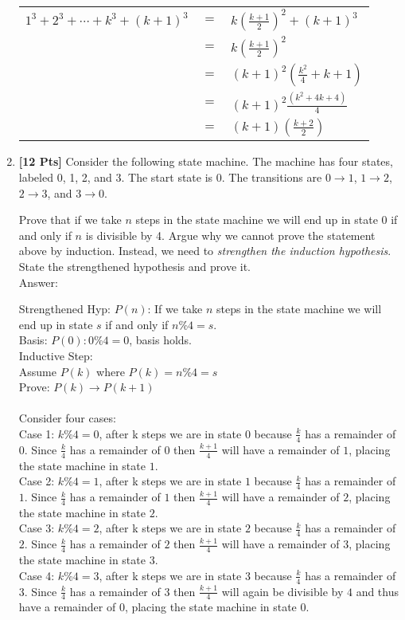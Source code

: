 \begin{enumerate}
\begin{table}[h]
\centering
\begin{tabular}{rcl}
$1^3 + 2^3 + \cdots + k^3 + (k+1)^3$ & $=$ & $k(\frac{k+1}{2})^2 + (k+1)^3$ \\
                                     & $=$ & $k(\frac{k+1}{2})^2$           \\
                                     & $=$ & $(k+1)^2 (\frac{k^2}{4} +k +1)$  \\
                                     & $=$ & $(k+1)^2 \frac{(k^2 +4k +4)}{4}$ \\
                                     & $=$ & $(k+1)(\frac{k+2}{2})$          
\end{tabular}
\end{table}

\item {\bf [12 Pts]} Consider the following state machine. The machine has four states, labeled 0, 1, 2, and 3. The start state is 0.
The transitions are $0 \rightarrow 1$, $1 \rightarrow 2$, $2 \rightarrow 3$,
and $3 \rightarrow 0$.

Prove that if we take $n$ steps in the state machine we will end up in state 0 if and only if $n$ is divisible by 4. Argue why we cannot prove the statement above by induction. Instead, we need to {\it strengthen the induction hypothesis}. State the strengthened hypothesis and prove it.\\

Answer:

Strengthened Hyp:  $P(n)$: If we take $n$ steps in the state machine we will end up in state $s$ if and only if $n\%4 = s$.\\

Basis: $P(0): 0\%4 = 0$, basis holds.\\
Inductive Step:\\
Assume $P(k)$ where $P(k) = n\%4 = s$\\
Prove: $P(k) \rightarrow P(k+1)$\\\\
Consider four cases:\\
Case 1: $k\%4 = 0$, after k steps we are in state $0$ because $\frac{k}{4}$ has a remainder of $0$. Since $\frac{k}{4}$ has a remainder of $0$ then $\frac{k+1}{4}$ will have a remainder of $1$, placing the state machine in state $1$.\\
Case 2: $k\%4 = 1$, after k steps we are in state $1$ because $\frac{k}{4}$ has a remainder of $1$. Since $\frac{k}{4}$ has a remainder of $1$ then $\frac{k+1}{4}$ will have a remainder of $2$, placing the state machine in state $2$.\\
Case 3: $k\%4 = 2$, after k steps we are in state $2$ because $\frac{k}{4}$ has a remainder of $2$. Since $\frac{k}{4}$ has a remainder of $2$ then $\frac{k+1}{4}$ will have a remainder of $3$, placing the state machine in state $3$.\\
Case 4: $k\%4 = 3$, after k steps we are in state $3$ because $\frac{k}{4}$ has a remainder of $3$. Since $\frac{k}{4}$ has a remainder of $3$ then $\frac{k+1}{4}$ will again be divisible by $4$ and thus have a remainder of $0$, placing the state machine in state $0$.\\


\end{enumerate}
